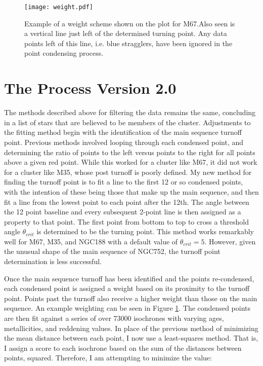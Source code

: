 \documentclass[aps,prb,twocolumn,groupedaddress,nofootinbib,floatfix]{revtex4-1}
\begin{document}
\begin{figure}[!h]
	\centering
      \texttt{[image: weight.pdf]}
	\caption{Example of a weight scheme shown on the plot for M67.Also seen is a vertical line just left of the determined turning point. Any data points left of this line, i.e. blue stragglers, have been ignored in the point condensing process.}
	\label{fig:weight}
\end{figure}

\section*{The Process Version 2.0}
The methods described above for filtering the data remains the same, concluding in a list of stars that are believed to be members of the cluster. Adjustments to the fitting method begin with the identification of the main sequence turnoff point. Previous methods involved looping through each condensed point, and determining the ratio of points to the left versus points to the right for all points above a given red point. While this worked for a cluster like M67, it did not work for a cluster like M35, whose post turnoff is poorly defined. My new method for finding the turnoff point is to fit a line to the first 12 or so condensed points, with the intention of these being those that make up the main sequence, and then fit a line from the lowest point to each point after the 12th. The angle between the 12 point baseline and every subsequent 2-point line is then assigned as a property to that point. The first point from bottom to top to cross a threshold angle $\theta_{crit}$ is determined to be the turning point. This method works remarkably well for M67, M35, and NGC188 with a default value of $\theta_{crit} = 5$. However, given the unusual shape of the main sequence of NGC752, the turnoff point determination is less successful.

Once the main sequence turnoff has been identified and the points re-condensed, each condensed point is assigned a weight based on its proximity to the turnoff point. Points past the turnoff also receive a higher weight than those on the main sequence. An example weighting can be seen in Figure \ref{fig:weight}. The condensed points are then fit against a series of over 73000 isochrones with varying ages, metallicities, and reddening values. In place of the previous method of minimizing the mean distance between each point, I now use a least-squares method. That is, I assign a score to each isochrone based on the sum of the distances between points, squared. Therefore, I am attempting to minimize the value:
\end{document}
